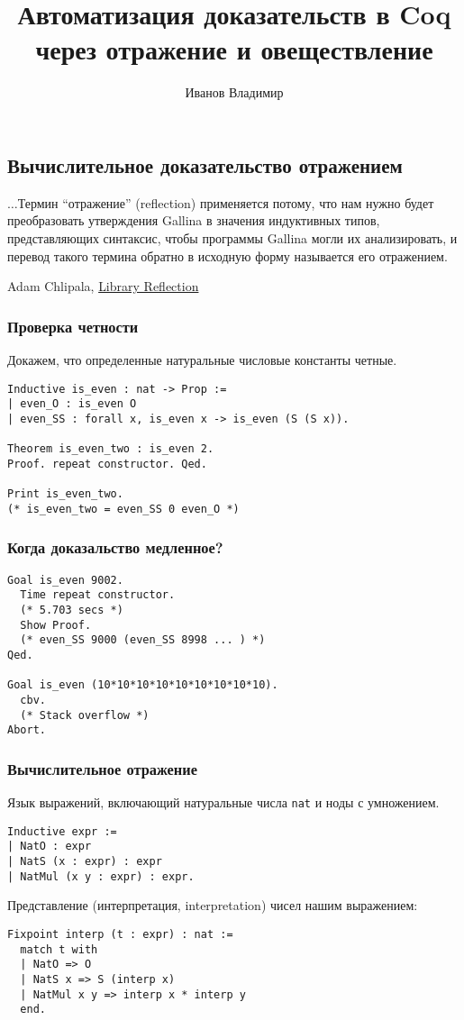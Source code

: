 \documentclass{beamer}
\title{Автоматизация доказательств в Coq через отражение и овеществление}
\author{Иванов Владимир}
\institute{Huawei Technologies\\
  Moscow Research Center\\
  Advanced Software Technology Lab
}
\date{}
\begin{document}
\begin{frame}
  \maketitle
\end{frame}

\begin{frame}
  \section{Вычислительное доказательство отражением}
  \setlength{\epigraphwidth}{\textwidth}
  \epigraph{
    $\ldots$Термин ``отражение'' (reflection) применяется потому, что нам нужно будет преобразовать утверждения Gallina в значения индуктивных типов, представляющих синтаксис, чтобы программы Gallina могли их анализировать, и перевод такого термина обратно в исходную форму называется его отражением.
  }{Adam Chlipala,  \href{http://adam.chlipala.net/cpdt/html/Reflection.html}{Library Reflection}}
\end{frame}

\begin{frame}[fragile]
  \frametitle{Проверка четности}
  Докажем, что определенные натуральные числовые константы четные.
\begin{verbatim}
Inductive is_even : nat -> Prop :=
| even_O : is_even O
| even_SS : forall x, is_even x -> is_even (S (S x)).

Theorem is_even_two : is_even 2.
Proof. repeat constructor. Qed.

Print is_even_two.
(* is_even_two = even_SS 0 even_O *)
\end{verbatim}
\end{frame}

\begin{frame}[fragile]
  \frametitle{Когда доказальство медленное?}
\begin{verbatim}
Goal is_even 9002.
  Time repeat constructor.
  (* 5.703 secs *)
  Show Proof.
  (* even_SS 9000 (even_SS 8998 ... ) *)
Qed.

Goal is_even (10*10*10*10*10*10*10*10*10).
  cbv.
  (* Stack overflow *)
Abort.
\end{verbatim}
\end{frame}

\begin{frame}[fragile]
  \frametitle{Вычислительное отражение}
  Язык выражений, включающий натуральные числа \texttt{nat} и ноды с умножением.
\begin{verbatim}
Inductive expr :=
| NatO : expr
| NatS (x : expr) : expr
| NatMul (x y : expr) : expr.
\end{verbatim}
  Представление (интерпретация, interpretation) чисел нашим выражением:
\begin{verbatim}
Fixpoint interp (t : expr) : nat :=
  match t with
  | NatO => O
  | NatS x => S (interp x)
  | NatMul x y => interp x * interp y
  end.
\end{verbatim}
\end{frame}
\end{document}
